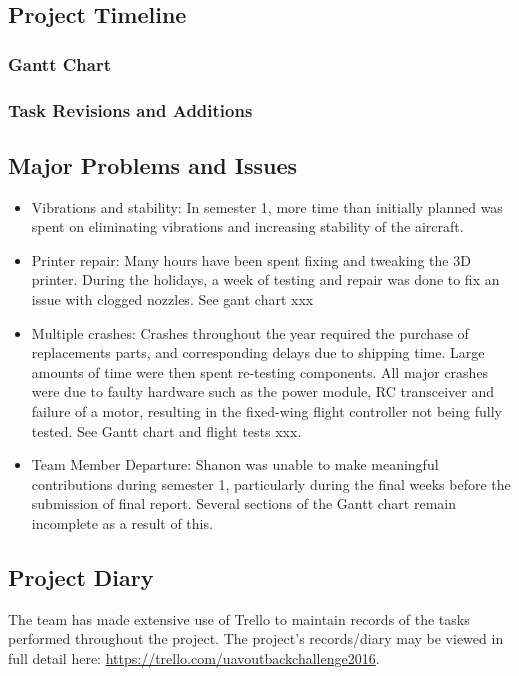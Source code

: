 \subsection{Project Timeline}
\subsubsection*{Gantt Chart}


\subsubsection*{Task Revisions and Additions}

\subsection{Major Problems and Issues}
\begin{itemize}
	\item Vibrations and stability: In semester 1, more time than initially planned was spent on eliminating vibrations and increasing stability of the aircraft. 
	
	\item Printer repair: Many hours have been spent fixing and tweaking the 3D printer.  During the holidays, a week of testing and repair was done to fix an issue with clogged nozzles. See gant chart xxx
	
	\item Multiple crashes: Crashes throughout the year required the purchase of replacements parts, and corresponding delays due to shipping time. Large amounts of time were then spent re-testing components. All major crashes were due to faulty hardware such as the power module, RC transceiver and failure of a motor, resulting in the fixed-wing flight controller not being fully tested. See Gantt chart and flight tests xxx.
	
	\item Team Member Departure: Shanon was unable to make meaningful contributions during semester 1, particularly during the final weeks before the submission of final report. Several sections of the Gantt chart remain incomplete as a result of this.
\end{itemize}

\subsection{Project Diary}
The team has made extensive use of Trello to maintain records of the tasks performed throughout the project. The project's records/diary may be viewed in full detail here: \url{https://trello.com/uavoutbackchallenge2016}.

